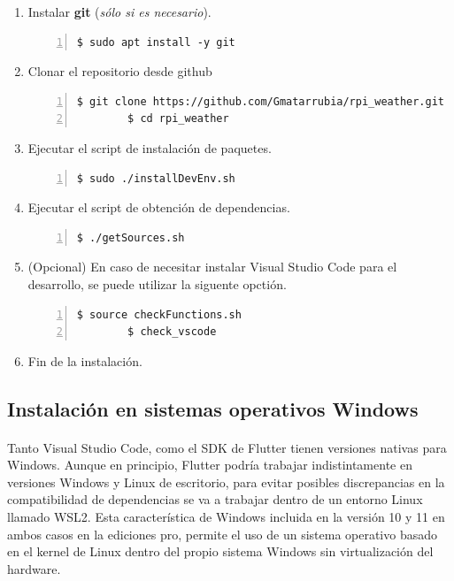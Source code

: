 \begin{enumerate}
    \item Instalar \textbf{\gls{git}} (\emph{sólo si es necesario}).
    \begin{lstlisting}[style=consola, numbers=left]
        $ sudo apt install -y git
    \end{lstlisting}

    \item Clonar el repositorio desde github
    \begin{lstlisting}[style=consola, numbers=left]
        $ git clone https://github.com/Gmatarrubia/rpi_weather.git
        $ cd rpi_weather
    \end{lstlisting}

    \item Ejecutar el script de instalación de paquetes.
    \begin{lstlisting}[style=consola, numbers=left]
        $ sudo ./installDevEnv.sh
    \end{lstlisting}

    \item Ejecutar el script de obtención de dependencias.
    \begin{lstlisting}[style=consola, numbers=left]
        $ ./getSources.sh
    \end{lstlisting}

    \item (Opcional) En caso de necesitar instalar Visual Studio Code para el desarrollo,
    se puede utilizar la siguente opctión.
    \begin{lstlisting}[style=consola, numbers=left]
        $ source checkFunctions.sh
        $ check_vscode
    \end{lstlisting}

    \item Fin de la instalación.
\end{enumerate}

\subsection{Instalación en sistemas operativos Windows}\label{sec:install_win_flutter}

\paragraph{}Tanto Visual Studio Code, como el \gls{SDK} de Flutter tienen versiones
nativas para Windows. Aunque en principio, Flutter podría trabajar indistintamente en
versiones Windows y Linux de escritorio, para evitar posibles discrepancias en la
compatibilidad de dependencias se va a trabajar dentro de un entorno Linux llamado
\gls{WSL2}. Esta característica de Windows incluida en la versión 10 y 11 en ambos
casos en la ediciones pro, permite el uso de un sistema operativo basado en el kernel
de Linux dentro del propio sistema Windows sin virtualización del hardware.

